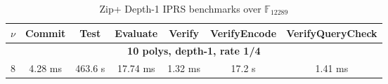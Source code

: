 \begin{table}[ht]
\centering
\caption{Zip+ Depth-1 IPRS benchmarks over $\mathbb{F}_{12289}$}
\label{tab:depth1-benchmarks}
\begin{tabular}{c|cccccc}
\toprule
$\nu$ & Commit & Test & Evaluate & Verify & VerifyEncode & VerifyQueryCheck \\
\midrule
\multicolumn{7}{c}{\textbf{10 polys, depth-1, rate 1/4}} \\
\midrule
  8 & 4.28 ms & 463.6 \textmu{}s & 17.74 ms & 1.32 ms & 17.2 \textmu{}s & 1.41 ms \\
\bottomrule
\end{tabular}
\end{table}
